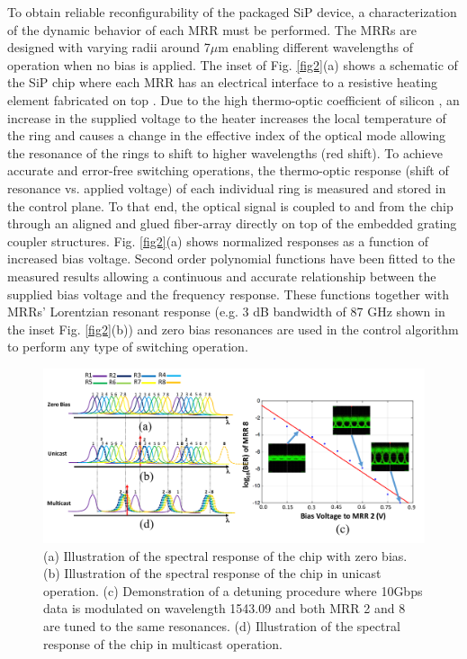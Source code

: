 To obtain reliable reconfigurability of the packaged SiP device, a characterization of the dynamic behavior of each MRR must be performed. The MRRs are designed with varying radii around 7$\mu$m enabling different wavelengths of operation when no bias is applied. The inset of Fig. \ref{fig2}(a) shows a schematic of the SiP chip where each MRR has an electrical interface to a resistive heating element fabricated on top \cite{atabaki2010optimization}. Due to the high thermo-optic coefficient of silicon \cite{komma2012thermo}, an increase in the supplied voltage to the heater increases the local temperature of the ring and causes a change in the effective index of the optical mode allowing the resonance of the rings to shift to higher wavelengths (red shift). To achieve accurate and error-free switching operations, the thermo-optic response (shift of resonance vs. applied voltage) of each individual ring is measured and stored in the control plane. To that end, the optical signal is coupled to and from the chip through an aligned and glued fiber-array directly on top of the embedded grating coupler structures. Fig. \ref{fig2}(a) shows normalized responses as a function of increased bias voltage. Second order polynomial functions have been fitted to the measured results allowing a continuous and accurate relationship between the supplied bias voltage and the frequency response. These functions together with MRRs' Lorentzian resonant response \cite{bahadori2016comprehensive} (e.g. 3 dB bandwidth of 87 GHz shown in the inset Fig. \ref{fig2}(b)) and zero bias resonances are used in the control algorithm to perform any type of switching operation.
 
\begin{figure}[b]
\begin{center}
\includegraphics[width=13cm]{Chapter3/fig3.pdf}
\caption{(a) Illustration of the spectral response of the chip with zero bias. (b) Illustration of the spectral response of the chip in unicast operation. (c) Demonstration of a detuning procedure where 10Gbps data is modulated on wavelength  1543.09 and both MRR 2 and 8 are tuned to the same resonances. (d) Illustration of the spectral response of the chip in multicast operation.}
\label{fig3}
\end{center}
\vspace{-0.9cm}
\end{figure}

